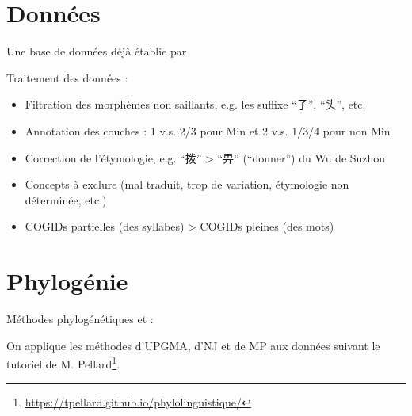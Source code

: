 \documentclass[11pt]{beamer}
\begin{document}
\section{Données}
\begin{frame}
Une base de données déjà établie par \textcite{wu2023annotating}

Traitement des données :
\begin{small}
\begin{itemize}
\item{Filtration des morphèmes non saillants, e.g. les suffixe ``子'', ``头'', etc.}

\item{Annotation des couches : 1 v.s. 2/3 pour Min et 2 v.s. 1/3/4 pour non Min}

\item{Correction de l'étymologie, e.g. ``拨'' > ``畀'' (``donner'') du Wu de Suzhou}

\item{Concepts à exclure (mal traduit, trop de variation, étymologie non déterminée, etc.)}

\item{COGIDs partielles (des syllabes) > COGIDs pleines (des mots)}
\end{itemize}
\end{small}
\end{frame}

\section{Phylogénie}
\begin{frame}{Méthodes phylogénétiques}
\textcite[74--75]{hall2018phylogenetic} et \textcite[15--16]{pellardfamily} :

%

\hspace*{\fill}

On applique les méthodes d'UPGMA, d'NJ et de MP aux données suivant le tutoriel de M. Pellard\footnote{\url{https://tpellard.github.io/phylolinguistique/}}.
\end{frame}
\end{document}
